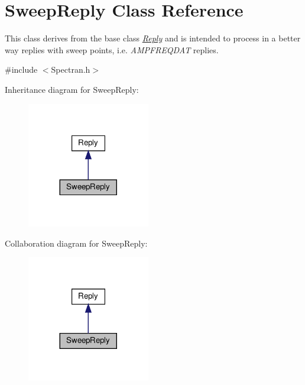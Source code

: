\hypertarget{classSweepReply}{}\section{Sweep\+Reply Class Reference}
\label{classSweepReply}


This class derives from the base class {\itshape \hyperlink{classReply}{Reply}} and is intended to process in a better way replies with sweep points, i.\+e. {\itshape A\+M\+P\+F\+R\+E\+Q\+D\+AT} replies.  




{\ttfamily \#include $<$Spectran.\+h$>$}



Inheritance diagram for Sweep\+Reply\+:\nopagebreak
\begin{figure}[H]
\begin{center}
\leavevmode
\includegraphics[width=152pt]{classSweepReply__inherit__graph}
\end{center}
\end{figure}


Collaboration diagram for Sweep\+Reply\+:\nopagebreak
\begin{figure}[H]
\begin{center}
\leavevmode
\includegraphics[width=152pt]{classSweepReply__coll__graph}
\end{center}
\end{figure}
